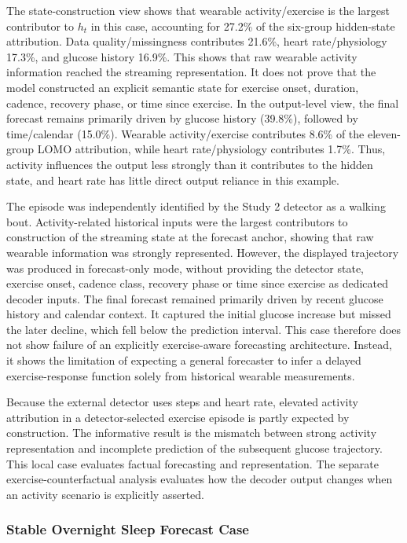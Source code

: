 The state-construction view shows that wearable activity/exercise is the
largest contributor to $h_t$ in this case, accounting for 27.2\% of the
six-group hidden-state attribution. Data quality/missingness contributes
21.6\%, heart rate/physiology 17.3\%, and glucose history 16.9\%. This shows
that raw wearable activity information reached the streaming representation.
It does not prove that the model constructed an explicit semantic state for
exercise onset, duration, cadence, recovery phase, or time since exercise. In
the output-level view, the final forecast remains primarily driven by glucose
history (39.8\%), followed by time/calendar (15.0\%). Wearable
activity/exercise contributes 8.6\% of the eleven-group LOMO attribution, while
heart rate/physiology contributes 1.7\%. Thus, activity influences the output
less strongly than it contributes to the hidden state, and heart rate has
little direct output reliance in this example.

The episode was independently identified by the Study 2 detector as a walking
bout. Activity-related historical inputs were the largest contributors to
construction of the streaming state at the forecast anchor, showing that raw
wearable information was strongly represented. However, the displayed
trajectory was produced in forecast-only mode, without providing the detector
state, exercise onset, cadence class, recovery phase or time since exercise as
dedicated decoder inputs. The final forecast remained primarily driven by
recent glucose history and calendar context. It captured the initial glucose
increase but missed the later decline, which fell below the prediction
interval. This case therefore does not show failure of an explicitly
exercise-aware forecasting architecture. Instead, it shows the limitation of
expecting a general forecaster to infer a delayed exercise-response function
solely from historical wearable measurements.

Because the external detector uses steps and heart rate, elevated activity
attribution in a detector-selected exercise episode is partly expected by
construction. The informative result is the mismatch between strong activity
representation and incomplete prediction of the subsequent glucose trajectory.
This local case evaluates factual forecasting and representation. The separate
exercise-counterfactual analysis evaluates how the decoder output changes when
an activity scenario is explicitly asserted.

\subsubsection{Stable Overnight Sleep Forecast Case}
\label{subsec:interp_case_sleep}

